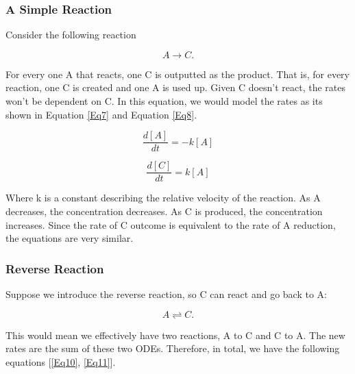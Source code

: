 \documentclass[11pt, letterpaper, english]{article}
\begin{document}
    \subsubsection{A Simple Reaction}

    \par{Consider the following reaction}

    \begin{equation}
        A \rightarrow C.
    \end{equation}

    \par{For every one A that reacts, one C is outputted as the product. That is, for every reaction, one C is created and one A is used up. Given C doesn’t react, the rates won’t be dependent on C. In this equation, we would model the rates as its shown in Equation \ref{Eq7} and Equation \ref{Eq8}.}

    \begin{equation}
        \frac{d [A]}{d t}=-k[A]
        \label{Eq7}
    \end{equation}

    \begin{equation}
        \frac{d [C]}{d t}=k[A]
        \label{Eq8}
    \end{equation}
    
    \par{Where k is a constant describing the relative velocity of the reaction. As A decreases, the concentration decreases. As C is produced, the concentration increases. Since the rate of C outcome is equivalent to the rate of A reduction, the equations are very similar.}

    \subsubsection{Reverse Reaction}

    \par{Suppose we introduce the reverse reaction, so C can react and go back to A:}

    \begin{equation}
        A \rightleftharpoons C.
    \end{equation}

    \par{This would mean we effectively have two reactions, A to C and C to A. The new rates are the sum of these two ODEs. Therefore, in total, we have the following equations [\ref{Eq10}, \ref{Eq11}].}
\end{document}
